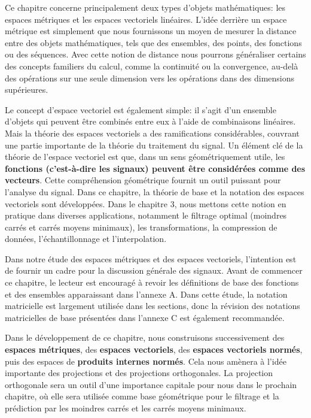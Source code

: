\documentclass[10pt,twoside,a4paper]{book}
\begin{document}
\noindent
Ce chapitre concerne principalement deux types d'objets mathématiques: les espaces métriques et les espaces vectoriels linéaires. L'idée derrière un espace métrique est 
simplement que nous fournissons un moyen de mesurer la distance entre des objets mathématiques, tels que des ensembles, des points, des fonctions ou des séquences. 
Avec cette notion de distance nous pourrons généraliser certains des concepts familiers du calcul, comme la continuité ou la convergence, au-delà des opérations sur une 
seule dimension vers les opérations dans des dimensions supérieures.

Le concept d'espace vectoriel est également simple: il s'agit d'un ensemble d'objets qui peuvent être combinés entre eux à l'aide de combinaisons linéaires. 
Mais la théorie des espaces vectoriels a des ramifications considérables, couvrant une partie importante de la théorie du traitement du signal. Un élément clé de la 
théorie de l'espace vectoriel est que, dans un sens géométriquement utile, les \textbf{fonctions (c'est-à-dire les signaux) peuvent être considérées comme des vecteurs}. 
Cette compréhension géométrique fournit un outil puissant pour l'analyse du signal. Dans ce chapitre, la théorie de base et la notation des espaces vectoriels sont développées. 
Dans le chapitre 3, nous mettons cette notion en pratique dans diverses applications, notamment le filtrage optimal (moindres carrés et carrés moyens minimaux), les transformations, 
la compression de données, l'échantillonnage et l'interpolation.


Dans notre étude des espaces métriques et des espaces vectoriels, l'intention est de fournir un cadre pour la discussion générale des signaux. Avant de commencer ce chapitre, 
le lecteur est encouragé à revoir les définitions de base des fonctions et des ensembles apparaissant dans l'annexe A. Dans cette étude, la notation matricielle est largement 
utilisée dans les sections, donc la révision des notations matricielles de base présentées dans l'annexe C est également recommandée.

Dans le développement de ce chapitre, nous construisons successivement des \textbf{espaces métriques}, des \textbf{espaces vectoriels}, des \textbf{espaces vectoriels normés}, puis des espaces de \textbf{produits internes normés}. 
Cela nous amènera à l'idée importante des projections et des projections orthogonales. La projection orthogonale sera un outil d'une importance capitale pour nous dans le prochain chapitre, 
où elle sera utilisée comme base géométrique pour le filtrage et la prédiction par les moindres carrés et les carrés moyens minimaux.
\end{document}
